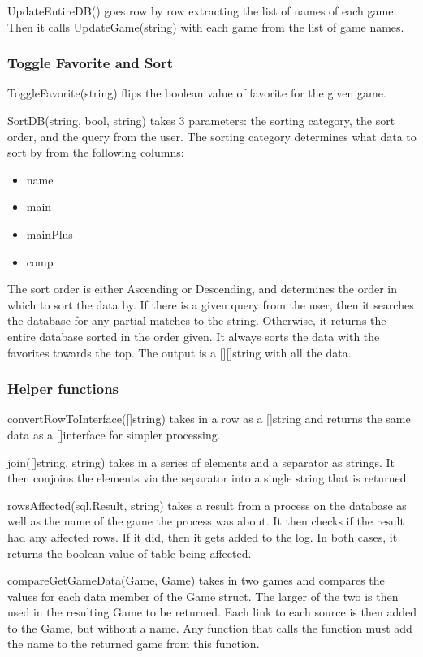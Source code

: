 UpdateEntireDB() goes row by row extracting the list of names of each game.
Then it calls UpdateGame(string) with each game from the list of game names.

\subsubsection{Toggle Favorite and Sort}
\label{subsubsec:TogFavSort}

ToggleFavorite(string) flips the boolean value of favorite for the given game.

SortDB(string, bool, string) takes 3 parameters: the sorting
category, the sort order, and the query from the user.
The sorting category determines what data to sort by from the following columns:
\begin{itemize}
	\item name
	\item main
	\item mainPlus
	\item comp
\end{itemize}
The sort order is either Ascending or Descending, and determines the
order in which to sort the data by.
If there is a given query from the user, then it searches the
database for any partial matches to the string.
Otherwise, it returns the entire database sorted in the order given.
It always sorts the data with the favorites towards the top.
The output is a [][]string with all the data.

\subsubsection{Helper functions}

convertRowToInterface([]string) takes in a row as a []string and
returns the same data as a []interface{} for simpler processing.

join([]string, string) takes in a series of elements and a separator as strings.
It then conjoins the elements via the separator into a single string
that is returned.

rowsAffected(sql.Result, string) takes a result from a process on the
database as well as the name of the game the process was about.
It then checks if the result had any affected rows. If it did, then
it gets added to the log.
In both cases, it returns the boolean value of table being affected.

compareGetGameData(Game, Game) takes in two games and compares the
values for each data member of the Game struct. The larger of the two
is then used in the resulting Game to be returned.
Each link to each source is then added to the Game, but without a name.
Any function that calls the function must add the name to the
returned game from this function.

